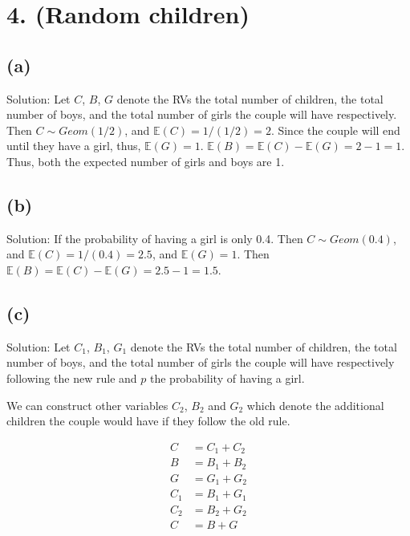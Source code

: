 \documentclass[10pt]{537homework}
\author{Peilun Dai}
\begin{document}
\section*{4. (Random children) }


\subsection*{(a)}

Solution: Let $C$, $B$, $G$ denote the RVs the total number of children, the total number of boys, and the total number of girls the couple will have respectively. Then $C \sim Geom(1/2)$, and $\mathbb{E}(C) = 1/(1/2) = 2$. Since the couple will end until they have a girl, thus, $\mathbb{E}(G) = 1$. $\mathbb{E}(B) = \mathbb{E}(C) - \mathbb{E}(G) = 2 - 1 = 1$. Thus, both the expected number of girls and boys are 1. 



\subsection*{(b)}

Solution: If the probability of having a girl is only 0.4. Then $C \sim Geom(0.4)$, and $\mathbb{E}(C) = 1/(0.4) = 2.5$, and $\mathbb{E}(G) = 1$. Then $\mathbb{E}(B) = \mathbb{E}(C) - \mathbb{E}(G) = 2.5 - 1 = 1.5$. 



\subsection*{(c)}

Solution: Let $C_1$, $B_1$, $G_1$ denote the RVs the total number of children, the total number of boys, and the total number of girls the couple will have respectively following the new rule and $p$ the probability of having a girl. 

We can construct other variables $C_2$, $B_2$ and $G_2$ which denote the additional children the couple would have if they follow the old rule. 

\begin{align}
  C   & = C_1 + C_2 \\
  B   & = B_1 + B_2 \\
  G   & = G_1 + G_2 \\
  C_1 & = B_1 + G_1 \\
  C_2 & = B_2 + G_2 \\
  C   & = B + G
\end{align}
\end{document}
